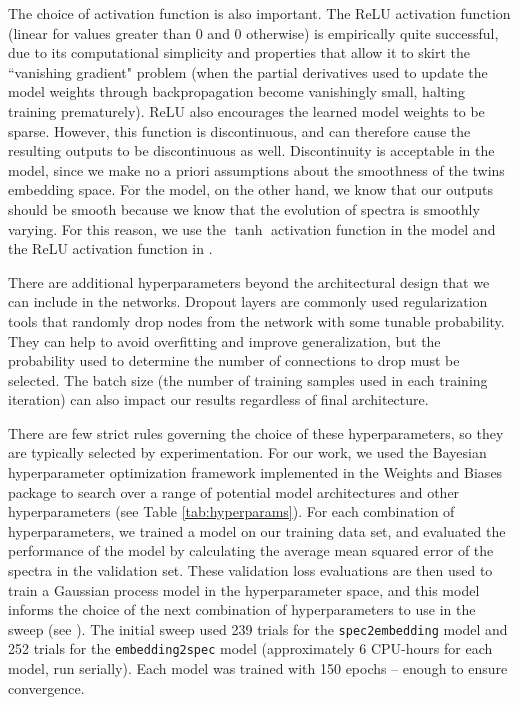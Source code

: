The choice of activation function is also important. The ReLU activation function (linear for values greater than 0 and 0 otherwise) is empirically quite successful, due to its computational simplicity and properties that allow it to skirt the ``vanishing gradient" problem (when the partial derivatives used to update the model weights through backpropagation become vanishingly small, halting training prematurely). ReLU also encourages the learned model weights to be sparse. However, this function is discontinuous, and can therefore cause the resulting outputs to be discontinuous as well. Discontinuity is acceptable in the \stoe{} model, since we make no a priori assumptions about the smoothness of the twins embedding space. For the \etos{} model, on the other hand, we know that our outputs should be smooth because we know that the evolution of spectra is smoothly varying. For this reason, we use the $\tanh$ activation function in the \etos{} model and the ReLU activation function in \stoe{}.

There are additional hyperparameters beyond the architectural design that we can include in the networks. Dropout layers \citep{srivastava_dropout_2014} are commonly used regularization tools that randomly drop nodes from the network with some tunable probability. They can help to avoid overfitting and improve generalization, but the probability used to determine the number of connections to drop must be selected. The batch size (the number of training samples used in each training iteration) can also impact our results regardless of final architecture.

There are few strict rules governing the choice of these hyperparameters, so they are typically selected by experimentation. For our work, we used the Bayesian hyperparameter optimization framework implemented in the Weights and Biases package \citep[\texttt{wandb},][]{biewald_experiment_2020} to search over a range of potential model architectures and other hyperparameters (see Table \ref{tab:hyperparams}). For each combination of hyperparameters, we trained a model on our training data set, and evaluated the performance of the model by calculating the average mean squared error of the spectra in the validation set. These validation loss evaluations are then used to train a Gaussian process model in the hyperparameter space, and this model informs the choice of the next combination of hyperparameters to use in the sweep (see \citet{snoek_practical_2012}). The initial sweep used 239 trials for the \verb|spec2embedding| model and 252 trials for the \verb|embedding2spec| model (approximately 6 CPU-hours for each model, run serially). Each model was trained with 150 epochs -- enough to ensure convergence.


